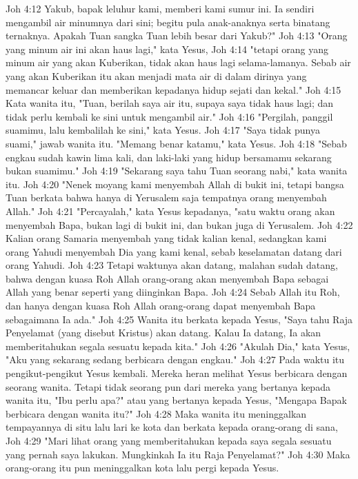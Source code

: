 Joh 4:12  Yakub, bapak leluhur kami, memberi kami sumur ini. Ia sendiri mengambil air minumnya dari sini; begitu pula anak-anaknya serta binatang ternaknya. Apakah Tuan sangka Tuan lebih besar dari Yakub?"
Joh 4:13  "Orang yang minum air ini akan haus lagi," kata Yesus,
Joh 4:14  "tetapi orang yang minum air yang akan Kuberikan, tidak akan haus lagi selama-lamanya. Sebab air yang akan Kuberikan itu akan menjadi mata air di dalam dirinya yang memancar keluar dan memberikan kepadanya hidup sejati dan kekal."
Joh 4:15  Kata wanita itu, "Tuan, berilah saya air itu, supaya saya tidak haus lagi; dan tidak perlu kembali ke sini untuk mengambil air."
Joh 4:16  "Pergilah, panggil suamimu, lalu kembalilah ke sini," kata Yesus.
Joh 4:17  "Saya tidak punya suami," jawab wanita itu. "Memang benar katamu," kata Yesus.
Joh 4:18  "Sebab engkau sudah kawin lima kali, dan laki-laki yang hidup bersamamu sekarang bukan suamimu."
Joh 4:19  "Sekarang saya tahu Tuan seorang nabi," kata wanita itu.
Joh 4:20  "Nenek moyang kami menyembah Allah di bukit ini, tetapi bangsa Tuan berkata bahwa hanya di Yerusalem saja tempatnya orang menyembah Allah."
Joh 4:21  "Percayalah," kata Yesus kepadanya, "satu waktu orang akan menyembah Bapa, bukan lagi di bukit ini, dan bukan juga di Yerusalem.
Joh 4:22  Kalian orang Samaria menyembah yang tidak kalian kenal, sedangkan kami orang Yahudi menyembah Dia yang kami kenal, sebab keselamatan datang dari orang Yahudi.
Joh 4:23  Tetapi waktunya akan datang, malahan sudah datang, bahwa dengan kuasa Roh Allah orang-orang akan menyembah Bapa sebagai Allah yang benar seperti yang diinginkan Bapa.
Joh 4:24  Sebab Allah itu Roh, dan hanya dengan kuasa Roh Allah orang-orang dapat menyembah Bapa sebagaimana Ia ada."
Joh 4:25  Wanita itu berkata kepada Yesus, "Saya tahu Raja Penyelamat (yang disebut Kristus) akan datang. Kalau Ia datang, Ia akan memberitahukan segala sesuatu kepada kita."
Joh 4:26  "Akulah Dia," kata Yesus, "Aku yang sekarang sedang berbicara dengan engkau."
Joh 4:27  Pada waktu itu pengikut-pengikut Yesus kembali. Mereka heran melihat Yesus berbicara dengan seorang wanita. Tetapi tidak seorang pun dari mereka yang bertanya kepada wanita itu, "Ibu perlu apa?" atau yang bertanya kepada Yesus, "Mengapa Bapak berbicara dengan wanita itu?"
Joh 4:28  Maka wanita itu meninggalkan tempayannya di situ lalu lari ke kota dan berkata kepada orang-orang di sana,
Joh 4:29  "Mari lihat orang yang memberitahukan kepada saya segala sesuatu yang pernah saya lakukan. Mungkinkah Ia itu Raja Penyelamat?"
Joh 4:30  Maka orang-orang itu pun meninggalkan kota lalu pergi kepada Yesus.
